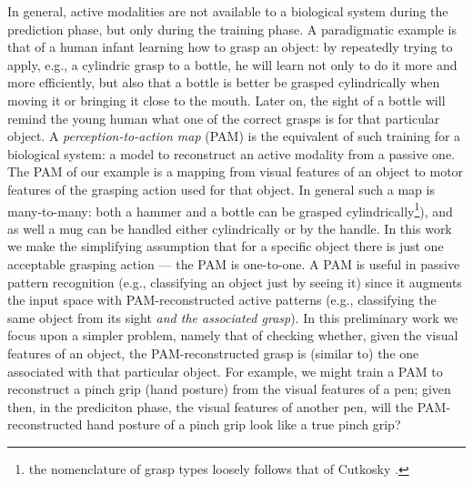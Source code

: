 In general, active modalities are not available to a biological system during the prediction phase, but only during the training phase. A paradigmatic example is that of a human infant learning how to grasp an object: by repeatedly trying to apply, e.g., a cylindric grasp to a bottle, he will learn not only to do it more and more efficiently, but also that a bottle is better be grasped cylindrically when moving it or bringing it close to the mouth. Later on, the sight of a bottle will remind the young human what one of the correct grasps is for that particular object. 
A \emph{perception-to-action map} (PAM) is the equivalent of such training for a biological system: a model to reconstruct an active modality from a passive one. The PAM of our example is a mapping from visual features of an object to motor features of the grasping action used for that object. In general such a map is many-to-many: both a hammer and a bottle can be grasped cylindrically\footnote{the nomenclature of grasp types loosely follows that of Cutkosky \cite{cutkosky}.}), and as well a mug can be handled either cylindrically or by the handle. In this work we make the simplifying assumption that for a specific object there is just one acceptable grasping action --- the PAM is one-to-one.
A PAM is useful in passive pattern recognition (e.g., classifying an object just by seeing it) since it augments the input space with PAM-reconstructed active patterns (e.g., classifying the same object from its sight \emph{and the associated grasp}). In this preliminary work we focus upon a simpler problem, namely that of checking whether, given the visual features of an object, the PAM-reconstructed grasp is (similar to) the one associated with that particular object. For example, we might train a PAM to reconstruct a pinch grip (hand posture) from the visual features of a pen; given then, in the prediciton phase, the visual features of another pen, will the PAM-reconstructed hand posture of a pinch grip look like a true pinch grip?



